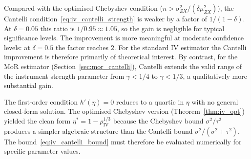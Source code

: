 \begin{remark}
\label{rem:cantelli_gain}
    Compared with the optimised Chebyshev condition ($n>\sigma_{ZX}^2/(\delta\mu_{ZX}^2)$), the Cantelli condition~\eqref{eq:iv_cantelli_strength} is weaker by a factor of $1/(1-\delta)$. At $\delta=0.05$ this ratio is $1/0.95\approx 1.05$, so the gain is negligible for typical significance levels. The improvement is more meaningful at moderate confidence levels: at $\delta=0.5$ the factor reaches $2$. For the standard IV estimator the Cantelli improvement is therefore primarily of theoretical interest. By contrast, for the MoR estimator (Section~\ref{sec:mor_cantelli}), Cantelli extends the valid range of the instrument strength parameter from $\gamma<1/4$ to $\gamma<1/3$, a qualitatively more substantial gain.
\end{remark}

\begin{remark}
    \label{rem:cantelli_noform}
    The first-order condition $h'(\eta)=0$ reduces to a quartic in $\eta$ with no general closed-form solution. The optimised Chebyshev version (Theorem~\ref{thm:iv_opt}) yielded the clean form $\eta^*=1-\rho_\mathrm{IV}^{1/3}$ because the Chebyshev bound $\sigma^2/\tau^2$ produces a simpler algebraic structure than the Cantelli bound $\sigma^2/(\sigma^2+\tau^2)$. The bound~\eqref{eq:iv_cantelli_bound} must therefore be evaluated numerically for specific parameter values.
\end{remark}
